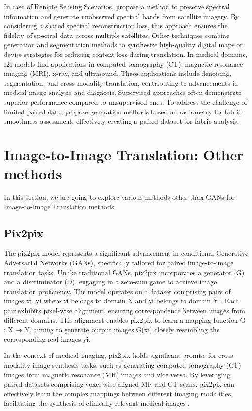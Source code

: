 \documentclass[UKenglish,12pt]{master-style}
\begin{document}
In case of Remote Sensing Scenarios, \cite{application} propose a method to preserve spectral information and generate unobserved spectral bands from satellite imagery. By considering a shared spectral reconstruction loss, this approach ensures the fidelity of spectral data across multiple satellites. Other techniques combine generation and segmentation methods to synthesize high-quality digital maps or devise strategies for reducing content loss during translation. In medical domains, I2I models find applications in computed tomography (CT), magnetic resonance imaging (MRI), x-ray, and ultrasound. These applications include denoising, segmentation, and cross-modality translation, contributing to advancements in medical image analysis and diagnosis. Supervised approaches often demonstrate superior performance compared to unsupervised ones. To address the challenge of limited paired data,\cite{application} propose generation methods based on radiometry for fabric smoothness assessment, effectively creating a paired dataset for fabric analysis.

\section{Image-to-Image Translation: Other methods}

In this section, we are going to explore various methods other than GANs for Image-to-Image Translation methods: 

\subsection{Pix2pix}

The pix2pix model represents a significant advancement in conditional Generative Adversarial Networks (GANs), specifically tailored for paired image-to-image translation tasks. Unlike traditional GANs, pix2pix incorporates a generator (G) and a discriminator (D), engaging in a zero-sum game to achieve image translation proficiency. The model operates on a dataset comprising pairs of images {xi, yi} where xi belongs to domain X and yi belongs to domain Y \cite{pix2pix} . Each pair exhibits pixel-wise alignment, ensuring correspondence between images from different domains. This alignment enables pix2pix to learn a mapping function G : X → Y, aiming to generate output images G(xi) closely resembling the corresponding real images yi.

In the context of medical imaging, pix2pix holds significant promise for cross-modality image synthesis tasks, such as generating computed tomography (CT) images from magnetic resonance (MR) images and vice versa. By leveraging paired datasets comprising voxel-wise aligned MR and CT scans, pix2pix can effectively learn the complex mappings between different imaging modalities, facilitating the synthesis of clinically relevant medical images \cite{pix2pix} .
\end{document}
